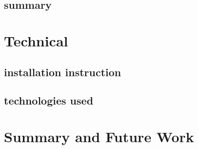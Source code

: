 \documentclass[shortabstract, english, inz]{iithesis}
\begin{document}
    \section{summary}
\chapter{Technical}
\label{chapter5}
    \section{installation instruction}
    \section{technologies used}
\chapter{Summary and Future Work}
\label{chapter6}


\printbibliography[sorting=none]
\end{document}
